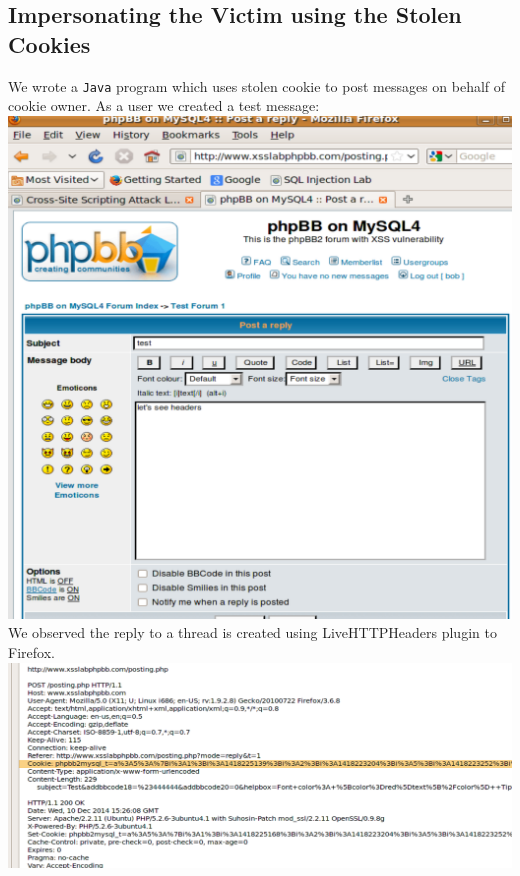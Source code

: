 \documentclass[12pt, a4paper, pdflatex]{article}
\begin{document}
\subsection{Impersonating the Victim using the Stolen Cookies}
We wrote a \texttt{Java} program which uses stolen cookie to post messages on behalf of cookie owner. As a user we created a test message:\\

\includegraphics[width=.95\textwidth]{gfx/xss/task4-see-headers.png}\\[1cm]

We observed the reply to a thread is created using LiveHTTPHeaders plugin to Firefox.\\

\includegraphics[width=.95\textwidth]{gfx/xss/task4-inspecting-headers.png}\\[1cm]
\end{document}
